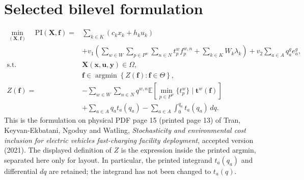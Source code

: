 \documentclass{article}
\begin{document}
\section*{Selected bilevel formulation}
\begin{equation}
\begin{aligned}
\min_{(\mathbf X,\mathbf f)}\quad
\mathrm{PI}(\mathbf X,\mathbf f)
={}&\sum_{k\in K}(c_kx_k+h_ku_k)\\
&+v_1\left(\sum_{w\in W}\sum_{p\in P^w}\sum_{n\in N}t_p^wf_p^{w,n}
+\sum_{k\in K}W_k\lambda_k\right)
+v_2\sum_{a\in A}q_a^ge_a^g,\\
\text{s.t.}\quad&\mathbf X(\mathbf x,\mathbf u,\mathbf y)\in\Omega,\\
&\mathbf f\in\operatorname*{argmin}\left\{Z(\mathbf f):\mathbf f\in\Theta\right\},\\
Z(\mathbf f)={}&-\sum_{w\in W}\sum_{n\in N}q^{w,n}
\mathbb E\left[\min_{p\in P^w}\{t_p^w\}\mid\mathbf t^w(\mathbf f)\right]\\
&+\sum_{a\in A}q_at_a(q_a)-\sum_{a\in A}\int_0^{q_a}t_a(q_a)\,dq.
\end{aligned}\tag{23}
\end{equation}
This is the formulation on physical PDF page 15 (printed page 13) of Tran, Keyvan-Ekbatani, Ngoduy and Watling, \emph{Stochasticity and environmental cost inclusion for electric vehicles fast-charging facility deployment}, accepted version (2021). The displayed definition of $Z$ is the expression inside the printed argmin, separated here only for layout. In particular, the printed integrand $t_a(q_a)$ and differential $dq$ are retained; the integrand has not been changed to $t_a(q)$.
\end{document}
